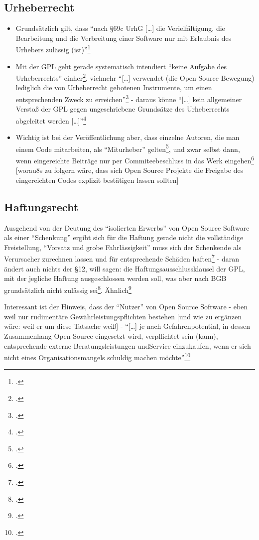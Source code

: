 \documentclass[DIV=calc,BCOR=5mm,11pt,headings=small,oneside,abstract=true, toc=bib]{scrartcl}
\begin{document}
\subsection{Urheberrecht}

\begin{itemize}
  \item Grundsätzlich gilt, dass \enquote{nach §69c UrhG [\ldots] die
  Verielfältigung, die Bearbeitung und die Verbreitung einer Software nur
  mit Erlaubnis des Urhebers zulässig (ist)}\footcite[][22]{Spindler2004a}
  \item Mit der GPL geht gerade systematisch intendiert \enquote{keine
  Aufgabe des Urheberrechts} einher\footcite[][22]{Spindler2004a},
  vielmehr \enquote{[\ldots] verwendet (die Open Source Bewegung) lediglich
  die von Urheberrecht gebotenen Instrumente, um einen entsprechenden
  Zweck zu erreichen}\footcite[vgl.][26]{Spindler2004a} - daraus könne
  \enquote{[\ldots] kein allgemeiner Verstoß der GPL gegen ungeschriebene
  Grundsätze des Urheberrechts abgeleitet werden
  [\ldots]}\footcite[vgl.][25]{Spindler2004a}
  \item Wichtig ist bei der Veröffentlichung aber, dass einzelne Autoren, die
  man einem Code mitarbeiten, als \enquote{Miturheber}
  gelten\footcite[vgl.][27]{Spindler2004a}, und zwar selbst dann, wenn
  eingereichte Beiträge nur per Commiteebeschluss in das Werk
  eingehen\footcite[vgl.][28]{Spindler2004a} [worau8s zu folgern wäre, dass
  sich Open Source Projekte die Freigabe des eingereichten Codes explizit
  bestätigen lassen sollten]
\end{itemize}

\subsection{Haftungsrecht}

Ausgehend von der Deutung des \enquote{isolierten Erwerbs} von Open Source
Software als einer \enquote{Schenkung} ergibt sich für die Haftung gerade
nicht die vollständige Freistellung, \enquote{Vorsatz und grobe
Fahrlässigkeit} muss sich der Schenkende als Verursacher zurechnen lassen
und für entsprechende Schäden haften\footcite[vgl.][169f]{Spindler2004a} - daran
ändert auch nichts der §12, will sagen: die Haftungsausschlussklausel der GPL,
mit der jegliche Haftung ausgeschlossen werden soll, was aber nach BGB
grundsätzlich nicht zulässig sei\footcite[vgl.][170]{Spindler2004a}.
Ähnlich\footcite[vgl.][205]{Spindler2004a}

Interessant ist der Hinweis, dass der \enquote{Nutzer} von Open Source
Software - eben weil nur rudimentäre Gewährleistungspflichten bestehen [und
wie zu ergänzen wäre: weil er um diese Tatsache weiß] - \enquote{[\ldots]
je nach Gefahrenpotential, in dessen Zusammenhang Open Source eingesetzt
wird, verpflichtet sein (kann), entsprechende externe Beratungsleistungen
undService einzukaufen, wenn er sich nicht eines Organisationsmangels
schuldig machen möchte}\footcite[vgl.][221]{Spindler2004a}

\small



\end{document}
